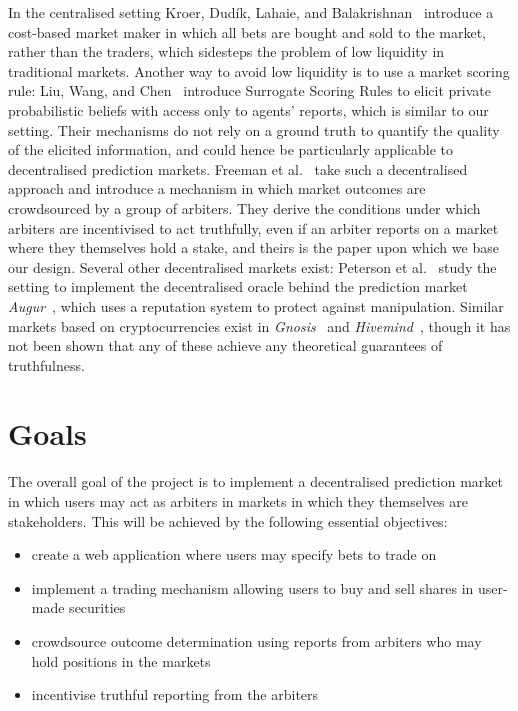 \documentclass[10pt,a4paper]{article}
\theoremstyle{plain}
\theoremstyle{definition}
\begin{document}
In the centralised setting Kroer, Dud\'ik, Lahaie, and
Balakrishnan~\cite{Kroer2016} introduce a cost-based market maker in which all
bets are bought and sold to the market, rather than the traders, which
sidesteps the problem of low liquidity in traditional markets. Another way to
avoid low liquidity is to use a market scoring rule: Liu, Wang, and
Chen~\cite{Liu2020} introduce Surrogate Scoring Rules to elicit private
probabilistic beliefs with access only to agents' reports, which is similar to
our setting. Their mechanisms do not rely on a ground truth to quantify the
quality of the elicited information, and could hence be particularly applicable
to decentralised prediction markets. Freeman et al.~\cite{CODiPM} take such a
decentralised approach and introduce a mechanism in which market outcomes are
crowdsourced by a group of arbiters. They derive the conditions under which
arbiters are incentivised to act truthfully, even if an arbiter reports on a
market where they themselves hold a stake, and theirs is the paper upon which
we base our design. Several other decentralised markets exist: Peterson et
al.~\cite{Peterson2015} study the setting to implement the decentralised oracle
behind the prediction market \emph{Augur}~\cite{Augur}, which uses a reputation
system to protect against manipulation. Similar markets based on
cryptocurrencies exist in \emph{Gnosis}~\cite{Gnosis} and
\emph{Hivemind}~\cite{Hivemind}, though it has not been shown that any of these
achieve any theoretical guarantees of truthfulness.

\section{Goals}

\label{sec:goals}

The overall goal of the project is to implement a decentralised prediction
market in which users may act as arbiters in markets in which they themselves
are stakeholders. This will be achieved by the following essential objectives:

\begin{itemize}
	\itemsep0em
	\item create a web application where users may specify bets to trade on
	\item implement a trading mechanism allowing users to buy and sell
		shares in user-made securities
	\item crowdsource outcome determination using reports from arbiters who may
		hold positions in the markets
	\item incentivise truthful reporting from the arbiters
\end{itemize}
\end{document}

